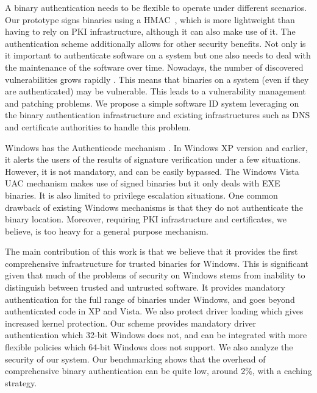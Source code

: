 A binary authentication needs to be flexible to operate under different
scenarios.
Our prototype signs binaries using a HMAC~\cite{krawczyk1997rfc2104},
which is more lightweight
than having to rely on PKI infrastructure, although it can also make use of it.
The authentication scheme additionally allows for other security benefits.
Not only is it important to authenticate software on a system but one also needs
to deal with the maintenance of the software over time.
Nowadays, the number of discovered vulnerabilities grows rapidly 
\cite{CERT-vul}.
This means that binaries on a system (even if they are authenticated) may
be vulnerable. This leads to a vulnerability management and patching problems.
We propose a simple software ID system leveraging on the binary
authentication infrastructure and existing infrastructures such as DNS and certificate authorities
to handle this problem.

Windows has the Authenticode mechanism \cite{authenticode}.
In Windows XP version and earlier, 
it alerts the users of the results of signature verification under
a few situations. However, it is not mandatory, and can be easily bypassed.
The Windows Vista UAC mechanism makes use of signed binaries but it only
deals with EXE binaries. It is also limited to privilege escalation situations.
One common drawback of existing Windows mechanisms is that they do not 
authenticate the binary location.
Moreover, requiring PKI infrastructure and certificates, 
we believe, is too heavy for a general purpose mechanism.

The main contribution of this work is that we believe that it provides the first
comprehensive infrastructure for trusted binaries for Windows.
This is significant given that much of the problems of security on Windows stems from
inability to distinguish between trusted and untrusted software.
It provides mandatory authentication for the full range of binaries under Windows, and goes beyond
authenticated code in XP and Vista.
We also protect driver loading which gives increased kernel protection.
Our scheme provides mandatory driver authentication which 32-bit Windows does not,
and can be integrated with more flexible policies which 64-bit Windows does not support.
We also analyze the security of our system. 
Our benchmarking shows that the overhead of comprehensive binary
authentication can be quite low, around 2\%,
with a caching strategy.

